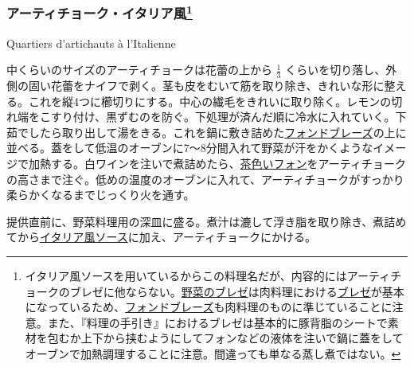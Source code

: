 \begin{recette}
\atoaki{}

\hypertarget{quartiers-d-artichauts-a-l-italienne}{%
\subsubsection[アーティチョーク・イタリア風]{\texorpdfstring{アーティチョーク・イタリア風\footnote{イタリア風ソースを用いているからこの料理名だが、内容的にはアーティチョークのブレゼに他ならない。\protect\hyperlink{braisage-des-legumes}{野菜のブレゼ}は肉料理における\protect\hyperlink{es-braises-ordinaires}{ブレゼ}が基本になっているため、\protect\hyperlink{le-fonds-de-braise}{フォンドブレーズ}も肉料理のものに準じていることに注意。また、『料理の手引き』におけるブレゼは基本的に豚背脂のシートで素材を包むか上下から挟むようにしてフォンなどの液体を注いで鍋に蓋をしてオーブンで加熱調理することに注意。間違っても単なる蒸し煮ではない。}}{アーティチョーク・イタリア風}}\label{quartiers-d-artichauts-a-l-italienne}}

\begin{frsubenv}

Quartiers d'artichauts à l'Italienne

\end{frsubenv}


中くらいのサイズのアーティチョークは花蕾の上から \(\frac{1}{3}\)
くらいを切り落し、外側の固い花蕾をナイフで剥く。茎も皮をむいて筋を取り除き、きれいな形に整える。これを縦4つに櫛切りにする。中心の繊毛をきれいに取り除く。レモンの切れ端をこすり付け、黒ずむのを防ぐ。下処理が済んだ順に冷水に入れていく。下茹でしたら取り出して湯をきる。これを鍋に敷き詰めた\protect\hyperlink{fonds-de-braise}{フォンドブレーズ}の上に並べる。蓋をして低温のオーブンに7〜8分間入れて野菜が汗をかくようなイメージで加熱する。白ワインを注いで煮詰めたら、\protect\hyperlink{fonds-brun}{茶色いフォン}をアーティチョークの高さまで注ぐ。低めの温度のオーブンに入れて、アーティチョークがすっかり柔らかくなるまでじっくり火を通す。

提供直前に、野菜料理用の深皿に盛る。煮汁は漉して浮き脂を取り除き、煮詰めてから\protect\hyperlink{sauce-italienne}{イタリア風ソース}に加え、アーティチョークにかける。


\end{recette}
